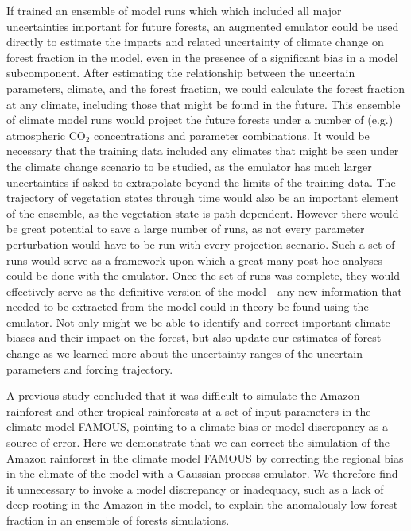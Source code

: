 \documentclass[gmd, manuscript]{copernicus}
\begin{document}
If trained an ensemble of model runs which which included all major uncertainties important for future forests, an augmented emulator could be used directly to estimate the impacts and related uncertainty of climate change on forest fraction in the model, even in the presence of a significant bias in a model subcomponent. After estimating the relationship between the uncertain parameters, climate, and the forest fraction, we could calculate the forest fraction at any climate, including those that might be found in the future. This ensemble of climate model runs would project the future forests under a number of (e.g.) atmospheric CO$_{2}$ concentrations and parameter combinations. It would be necessary that the training data included any climates that might be seen under the climate change scenario to be studied, as the emulator has much larger uncertainties if asked to extrapolate beyond the limits of the training data. The trajectory of vegetation states through time would also be an important element of the ensemble, as the vegetation state is path dependent. However there would be great potential to save a large number of runs, as not every parameter perturbation would have to be run with every projection scenario. Such a set of runs would serve as a framework upon which a great many post hoc analyses could be done with the emulator. Once the set of runs was complete, they would effectively serve as the definitive version of the model - any new information that needed to be extracted from the model could in theory be found using the emulator. Not only might we be able to identify and correct important climate biases and their impact on the forest, but also update our estimates of forest change as we learned more about the uncertainty ranges of the uncertain parameters and forcing trajectory.

\conclusions \label{sec:conclusions}

A previous study \citep{mcneall2016impact} concluded that it was difficult to simulate the Amazon rainforest and other tropical rainforests at a set of input parameters in the climate model FAMOUS, pointing to a climate bias or model discrepancy as a source of error. Here we demonstrate that we can correct the simulation of the Amazon rainforest in the climate model FAMOUS by correcting the regional bias in the climate of the model with a Gaussian process emulator. We therefore find it unnecessary to invoke a model discrepancy or inadequacy, such as a lack of deep rooting in the Amazon in the model, to explain the anomalously low forest fraction in an ensemble of forests simulations.  
\end{document}
